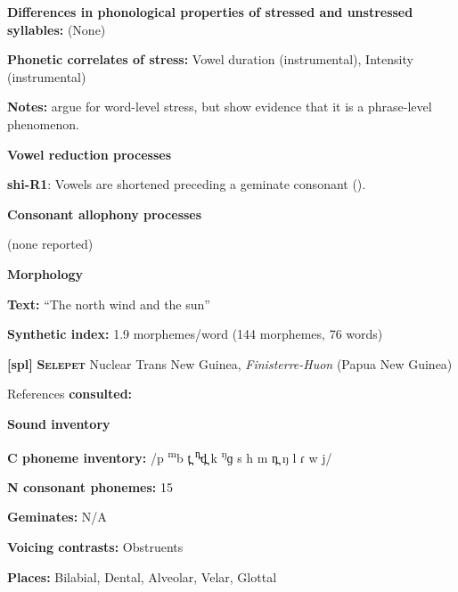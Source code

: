 \textbf{Differences in phonological properties of stressed and unstressed syllables:} (None)



\textbf{Phonetic correlates of stress:} Vowel duration (instrumental), Intensity (instrumental)



\textbf{Notes:} \citet{GordonNafi2012} argue for word-level stress, but \citet{RoettgerEtAl2015} show evidence that it is a phrase-level phenomenon.



\textbf{Vowel reduction processes}



\textbf{shi-R1}: Vowels are shortened preceding a geminate consonant (\citealt{DellElmedlouai2002}).



\textbf{Consonant allophony processes}



(none reported)



\textbf{Morphology}



\textbf{Text:} “The north wind and the sun” \citep[219]{Ridouane2014}



\textbf{Synthetic index:} 1.9 morphemes/word (144 morphemes, 76 words)



\textbf{[spl]}   \textbf{\textsc{Selepet}}  Nuclear Trans New Guinea, \textit{Finisterre-Huon} (Papua New Guinea)



References \textbf{consulted:} \citet{McElhanon1970}



\textbf{Sound inventory}



\textbf{C phoneme inventory:} /p \textsuperscript{m}b t̪ \textsuperscript{n̪}d̪ k \textsuperscript{ŋ}ɡ s h m n̪ ŋ l ɾ w j/



\textbf{N consonant phonemes:} 15



\textbf{Geminates:} N/A



\textbf{Voicing contrasts:} Obstruents



\textbf{Places:} Bilabial, Dental, Alveolar, Velar, Glottal



